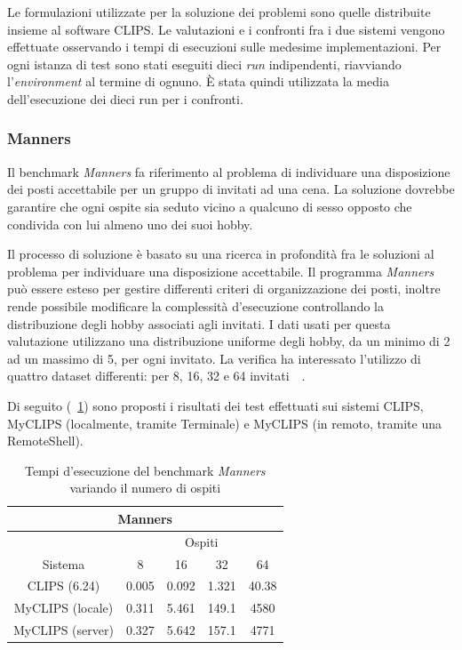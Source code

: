 Le formulazioni utilizzate per la soluzione dei problemi sono quelle distribuite insieme al software CLIPS. Le valutazioni e i confronti fra i due sistemi vengono effettuate osservando i tempi di esecuzioni sulle medesime implementazioni. Per ogni istanza di test sono stati eseguiti dieci \emph{run} indipendenti, riavviando l'\emph{environment} al termine di ognuno. \`E stata quindi utilizzata la media dell'esecuzione dei dieci run per i confronti.


\subsubsection{Manners}

Il benchmark \emph{Manners} fa riferimento al problema di individuare una disposizione dei posti accettabile per un gruppo di invitati ad una cena. La soluzione dovrebbe garantire che ogni ospite sia seduto vicino a qualcuno di sesso opposto che condivida con lui almeno uno dei suoi hobby.

Il processo di soluzione è basato su una ricerca in profondità fra le soluzioni al problema per individuare una disposizione accettabile. Il programma \emph{Manners} può essere esteso per gestire differenti criteri di organizzazione dei posti, inoltre rende possibile modificare la complessità d'esecuzione controllando la distribuzione degli hobby associati agli invitati. I dati usati per questa valutazione utilizzano una distribuzione uniforme degli hobby, da un minimo di 2 ad un massimo di 5, per ogni invitato. 
La verifica ha interessato l'utilizzo di quattro dataset differenti: per 8, 16, 32 e 64 invitati~\cite{kiernan:inria-00075406}~\cite{brantetal91}. 

Di seguito (\tablename~\ref{tab:bench-manners}) sono proposti i risultati dei test effettuati sui sistemi CLIPS, MyCLIPS (localmente, tramite Terminale) e MyCLIPS (in remoto, tramite una RemoteShell).

\begin{table}[h]
\caption{Tempi d'esecuzione del benchmark \emph{Manners} variando il numero di ospiti}\label{tab:bench-manners}
\centering
\begin{tabular}{|c||c|c|c|c|}
\hline 
\multicolumn{5}{|c|}{Manners} \\ 
\hline 
 & \multicolumn{4}{c|}{Ospiti} \\ 
\hline 
Sistema & 8 & 16 & 32 & 64 \\ 
\hline\hline
CLIPS (6.24) & 0.005 & 0.092 & 1.321 & 40.38 \\ 
\hline 
MyCLIPS (locale) & 0.311 & 5.461 & 149.1 & 4580 \\ 
\hline 
MyCLIPS (server) & 0.327 & 5.642 & 157.1 & 4771 \\ 
\hline 
\end{tabular} 
\end{table}

